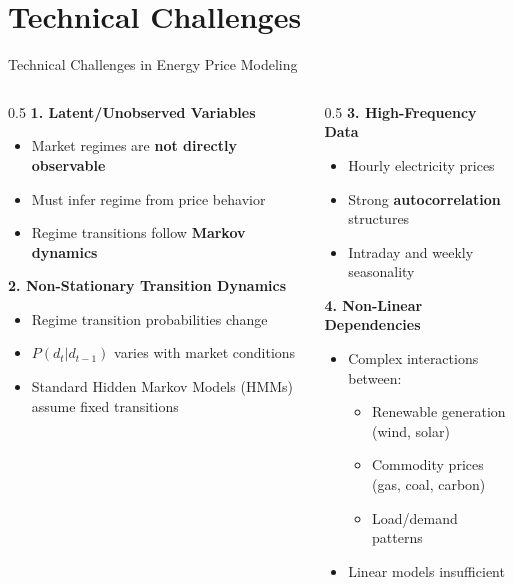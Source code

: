 \documentclass[aspectratio=169]{beamer}
\begin{document}
\section{Technical Challenges}

\begin{frame}{Technical Challenges in Energy Price Modeling}
\begin{columns}
\begin{column}{0.5\textwidth}
\textbf{1. Latent/Unobserved Variables}
\begin{itemize}
    \item Market regimes are \textbf{not directly observable}
    \item Must infer regime from price behavior
    \item Regime transitions follow \textbf{Markov dynamics}
\end{itemize}

\vspace{0.3cm}
\textbf{2. Non-Stationary Transition Dynamics}
\begin{itemize}
    \item Regime transition probabilities change
    \item $P(d_t | d_{t-1})$ varies with market conditions
    \item Standard Hidden Markov Models (HMMs) assume fixed transitions
\end{itemize}
\end{column}

\begin{column}{0.5\textwidth}
\textbf{3. High-Frequency Data}
\begin{itemize}
    \item Hourly electricity prices
    \item Strong \textbf{autocorrelation} structures
    \item Intraday and weekly seasonality
\end{itemize}

\vspace{0.3cm}
\textbf{4. Non-Linear Dependencies}
\begin{itemize}
    \item Complex interactions between:
    \begin{itemize}
        \item Renewable generation (wind, solar)
        \item Commodity prices (gas, coal, carbon)
        \item Load/demand patterns
    \end{itemize}
    \item Linear models insufficient
\end{itemize}
\end{column}
\end{columns}


\end{frame}
\end{document}
